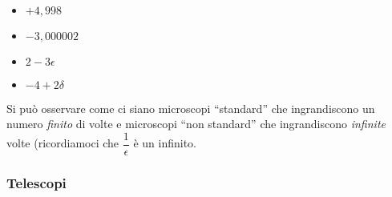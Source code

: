 \begin{esempio}
~

\begin{multicols}{4}
\begin{itemize}[nosep]
 \item \(+4,998\)
 \item \(-3,000002\)
 \item \(2-3\epsilon\)
 \item \(-4+2\delta\)
\end{itemize}
\end{multicols}

\begin{inaccessibleblock}
\begin{minipage}{.48\linewidth}
 \begin{center}
\scalebox{0.7}{\microscopioa}
 \end{center}
\end{minipage}
\hfill
\begin{minipage}{.48\linewidth}
 \begin{center}
\scalebox{0.7}{\microscopiob}
 \end{center}
\end{minipage}

\begin{minipage}{.48\linewidth}
 \begin{center}
\scalebox{0.7}{\microscopioc}
 \end{center}
\label{fig:microscopioc}
\end{minipage}
\hfill
\begin{minipage}{.48\linewidth}
 \begin{center}
\scalebox{0.7}{\microscopiod}
 \end{center}
\end{minipage}
\end{inaccessibleblock}
\end{esempio}
 
Si può osservare come ci siano microscopi ``standard'' che ingrandiscono un 
numero \emph{finito} di volte e microscopi ``non standard'' che 
ingrandiscono \emph{infinite} volte (ricordiamoci che \(\dfrac{1}{\epsilon}\) 
è un infinito.

\subsubsection{Telescopi}
\label{subsec:insnum_telescopi}

